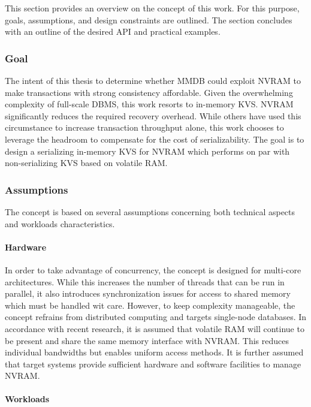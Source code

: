 This section provides an overview on the concept of this work. For this purpose,
goals, assumptions, and design constraints are outlined. The section concludes
with an outline of the desired API and practical examples.

\subsubsection{Goal}

The intent of this thesis to determine whether MMDB could exploit NVRAM to make
transactions with strong consistency affordable. Given the overwhelming
complexity of full-scale DBMS, this work resorts to in-memory KVS. NVRAM
significantly reduces the required recovery overhead. While others have used
this circumstance to increase transaction throughput alone, this work chooses to
leverage the headroom to compensate for the cost of serializability. The goal is
to design a serializing in-memory KVS for NVRAM which performs on par with
non-serializing KVS based on volatile RAM.

\subsubsection{Assumptions}

The concept is based on several assumptions concerning both technical aspects
and workloads characteristics.

\paragraph{Hardware}

In order to take advantage of concurrency, the concept is designed for
multi-core architectures. While this increases the number of threads that can be
run in parallel, it also introduces synchronization issues for access to shared
memory which must be handled wit care. However, to keep complexity manageable,
the concept refrains from distributed computing and targets single-node
databases. In accordance with recent research, it is assumed that volatile RAM
will continue to be present and share the same memory interface with NVRAM. This
reduces individual bandwidths but enables uniform access methods. It is further
assumed that target systems provide sufficient hardware and software facilities
to manage NVRAM.

\paragraph{Workloads}

